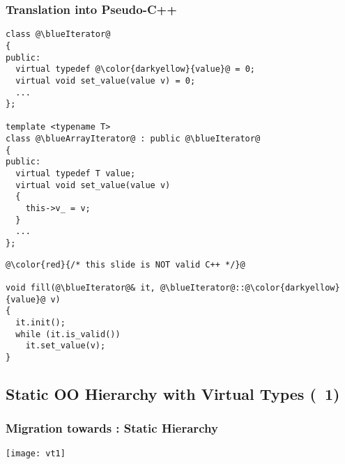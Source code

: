 \begin{frame}[fragile]
  \frametitle{Translation into Pseudo-C++}

\begin{multicols}{2}
%
\begin{lstlisting}[escapechar=@]
class @\blueIterator@
{
public:
  virtual typedef @\color{darkyellow}{value}@ = 0;
  virtual void set_value(value v) = 0;
  ...
};

template <typename T>
class @\blueArrayIterator@ : public @\blueIterator@
{
public:
  virtual typedef T value;
  virtual void set_value(value v)
  {
    this->v_ = v;
  }
  ...
};
\end{lstlisting}
%
\columnbreak
%
\begin{lstlisting}[escapechar=@]
@\color{red}{/* this slide is NOT valid C++ */}@

void fill(@\blueIterator@& it, @\blueIterator@::@\color{darkyellow}{value}@ v)
{
  it.init();
  while (it.is_valid())
    it.set_value(v);
}
\end{lstlisting}
%
\end{multicols}

\end{frame}



\subsection{Static OO Hierarchy with Virtual Types (\scoop~1)}



\begin{frame}
  \frametitle{Migration towards \scoop: Static Hierarchy}

\vspace*{-7mm}
  \begin{center}
    \texttt{[image: vt1]}
  \end{center}

\end{frame}




